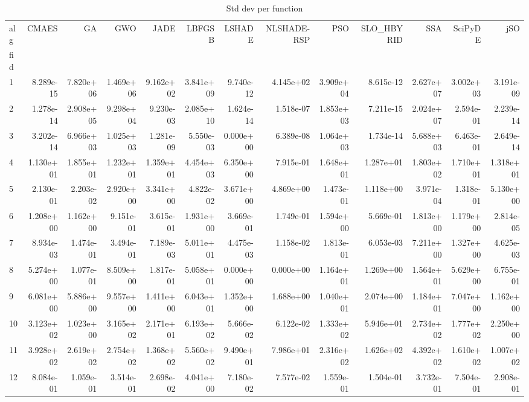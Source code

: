 \begin{table}
\caption{Std dev per function}
\label{tab:std_all}
\begin{tabular}{lrrrrrrrrrrrr}
\toprule
alg & CMAES & GA & GWO & JADE & LBFGSB & LSHADE & NLSHADE-RSP & PSO & SLO_HBYRID & SSA & SciPyDE & jSO \\
fid &  &  &  &  &  &  &  &  &  &  &  &  \\
\midrule
1 & 8.289e-15 & 7.820e+06 & 1.469e+06 & 9.162e+02 & 3.841e+09 & 9.740e-12 & 4.145e+02 & 3.909e+04 & 8.615e-12 & 2.627e+07 & 3.002e+03 & 3.191e-09 \\
2 & 1.278e-14 & 2.908e+05 & 9.298e+04 & 9.230e-03 & 2.085e+10 & 1.624e-14 & 1.518e-07 & 1.853e+03 & 7.211e-15 & 2.024e+07 & 2.594e-01 & 2.239e-14 \\
3 & 3.202e-14 & 6.966e+03 & 1.025e+03 & 1.281e-09 & 5.550e-03 & 0.000e+00 & 6.389e-08 & 1.064e+03 & 1.734e-14 & 5.688e+03 & 6.463e-01 & 2.649e-14 \\
4 & 1.130e+01 & 1.855e+01 & 1.232e+01 & 1.359e+01 & 4.454e+03 & 6.350e+00 & 7.915e-01 & 1.648e+01 & 1.287e+01 & 1.803e+02 & 1.710e+01 & 1.318e+01 \\
5 & 2.130e-01 & 2.203e-02 & 2.920e+00 & 3.341e+00 & 4.822e-02 & 3.671e+00 & 4.869e+00 & 1.473e-01 & 1.118e+00 & 3.971e-04 & 1.318e-01 & 5.130e+00 \\
6 & 1.208e+00 & 1.162e+00 & 9.151e-01 & 3.615e-01 & 1.931e+00 & 3.669e-01 & 1.749e-01 & 1.594e+00 & 5.669e-01 & 1.813e+00 & 1.179e+00 & 2.814e-05 \\
7 & 8.934e-03 & 1.474e-01 & 3.494e-01 & 7.189e-03 & 5.011e+01 & 4.475e-03 & 1.158e-02 & 1.813e-01 & 6.053e-03 & 7.211e+00 & 1.327e+00 & 4.625e-03 \\
8 & 5.274e+00 & 1.077e-01 & 8.509e+00 & 1.817e-01 & 5.058e+01 & 0.000e+00 & 0.000e+00 & 1.164e+01 & 1.269e+00 & 1.564e+01 & 5.629e+00 & 6.755e-01 \\
9 & 6.081e+00 & 5.886e+00 & 9.557e+00 & 1.411e+00 & 6.043e+01 & 1.352e+00 & 1.688e+00 & 1.040e+01 & 2.074e+00 & 1.184e+01 & 7.047e+00 & 1.162e+00 \\
10 & 3.123e+02 & 1.023e+00 & 3.165e+02 & 2.171e+01 & 6.193e+02 & 5.666e-02 & 6.122e-02 & 1.333e+02 & 5.946e+01 & 2.734e+02 & 1.777e+02 & 2.250e+00 \\
11 & 3.928e+02 & 2.619e+02 & 2.754e+02 & 1.368e+02 & 5.560e+02 & 9.490e+01 & 7.986e+01 & 2.316e+02 & 1.626e+02 & 4.392e+02 & 1.610e+02 & 1.007e+02 \\
12 & 8.084e-01 & 1.059e-01 & 3.514e-01 & 2.698e-02 & 4.041e+00 & 7.180e-02 & 7.577e-02 & 1.559e-01 & 1.504e-01 & 3.732e-01 & 7.504e-01 & 2.908e-01 \\

\end{tabular}
\end{table}
